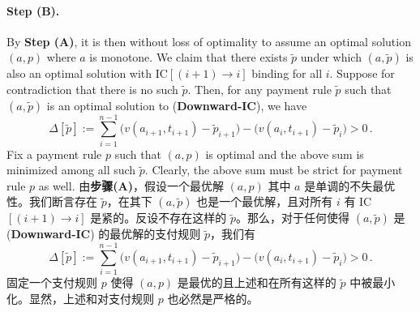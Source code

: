 \documentclass[12pt,letterpaper]{article}
\newenvironment{original}{\color{black}\noindent}{}
\newenvironment{translation}{\color{blue}\noindent}{}
\theoremstyle{plain}
\theoremstyle{definition}
\theoremstyle{remark}
\renewcommand{\1}{\mathds{1}}
\theoremstyle{definition}
\begin{document}
\paragraph{Step (B).}\hspace{-2mm}\begin{original}By \textbf{Step (A)}, it is then without loss of optimality to assume an optimal solution $(a, p)$ where $a$ is monotone. We claim that there exists $\tilde{p}$ under which $(a, \tilde{p})$ is also an optimal solution with IC$[(i+1) \rightarrow i]$ binding for all $i$. Suppose for contradiction that there is no such $\tilde{p}$. Then, for any payment rule $\tilde{p}$ such that $(a, \tilde{p})$ is an optimal solution to (\textbf{Downward-IC}), we have
\[\Delta[\tilde{p}] := \sum_{i=1}^{n-1} \big(v(a_{i+1}, t_{i+1}) - \tilde{p}_{i+1}\big) - \big(v(a_{i}, t_{i+1}) - \tilde{p}_{i}\big) > 0\,.\]
Fix a payment rule $p$ such that $(a,p)$ is optimal and the above sum is minimized among all such $\tilde{p}$. Clearly, the above sum must be strict for payment rule $p$ as well.
\end{original}
\begin{translation}
由\textbf{步骤(A)}，假设一个最优解 $(a, p)$ 其中 $a$ 是单调的不失最优性。我们断言存在 $\tilde{p}$，在其下 $(a, \tilde{p})$ 也是一个最优解，且对所有 $i$ 有 IC$[(i+1) \rightarrow i]$ 是紧的。反设不存在这样的 $\tilde{p}$。那么，对于任何使得 $(a, \tilde{p})$ 是 (\textbf{Downward-IC}) 的最优解的支付规则 $\tilde{p}$，我们有
\[\Delta[\tilde{p}] := \sum_{i=1}^{n-1} \big(v(a_{i+1}, t_{i+1}) - \tilde{p}_{i+1}\big) - \big(v(a_{i}, t_{i+1}) - \tilde{p}_{i}\big) > 0\,.\]
固定一个支付规则 $p$ 使得 $(a,p)$ 是最优的且上述和在所有这样的 $\tilde{p}$ 中被最小化。显然，上述和对支付规则 $p$ 也必然是严格的。
\end{translation}
\end{document}
